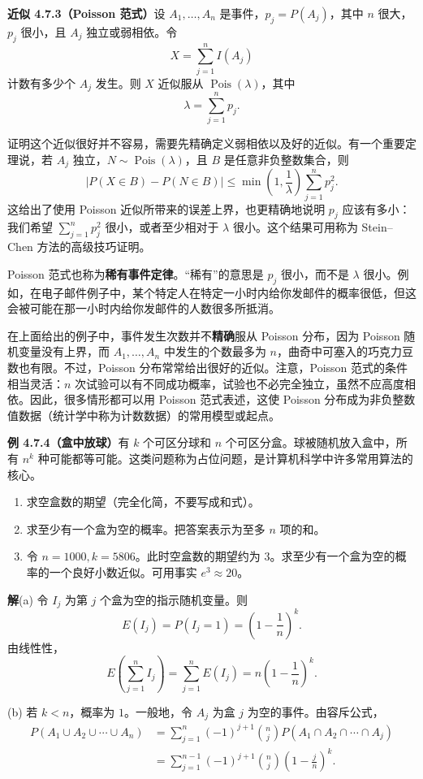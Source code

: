 \documentclass[UTF8,12pt,a4paper,fontset=fandol]{ctexart}
\begin{document}
\noindent\textbf{近似 4.7.3（Poisson 范式）}\quad 设 $A_1,\ldots,A_n$ 是事件，$p_j=P(A_j)$，其中 $n$ 很大，$p_j$ 很小，且 $A_j$ 独立或弱相依。令
\[
  X=\sum_{j=1}^n I(A_j)
\]
计数有多少个 $A_j$ 发生。则 $X$ 近似服从 $\operatorname{Pois}(\lambda)$，其中
\[
  \lambda=\sum_{j=1}^n p_j.
\]

证明这个近似很好并不容易，需要先精确定义弱相依以及好的近似。有一个重要定理说，若 $A_j$ 独立，$N\sim\operatorname{Pois}(\lambda)$，且 $B$ 是任意非负整数集合，则
\[
  |P(X\in B)-P(N\in B)|
  \le \min\left(1,\frac{1}{\lambda}\right)\sum_{j=1}^n p_j^2.
\]
这给出了使用 Poisson 近似所带来的误差上界，也更精确地说明 $p_j$ 应该有多小：我们希望 $\sum_{j=1}^n p_j^2$ 很小，或者至少相对于 $\lambda$ 很小。这个结果可用称为 Stein--Chen 方法的高级技巧证明。

Poisson 范式也称为\textbf{稀有事件定律}。“稀有”的意思是 $p_j$ 很小，而不是 $\lambda$ 很小。例如，在电子邮件例子中，某个特定人在特定一小时内给你发邮件的概率很低，但这会被可能在那一小时内给你发邮件的人数很多所抵消。

在上面给出的例子中，事件发生次数并不\textbf{精确}服从 Poisson 分布，因为 Poisson 随机变量没有上界，而 $A_1,\ldots,A_n$ 中发生的个数最多为 $n$，曲奇中可塞入的巧克力豆数也有限。不过，Poisson 分布常常给出很好的近似。注意，Poisson 范式的条件相当灵活：$n$ 次试验可以有不同成功概率，试验也不必完全独立，虽然不应高度相依。因此，很多情形都可以用 Poisson 范式表述，这使 Poisson 分布成为非负整数值数据（统计学中称为计数数据）的常用模型或起点。

\noindent\textbf{例 4.7.4（盒中放球）}\quad 有 $k$ 个可区分球和 $n$ 个可区分盒。球被随机放入盒中，所有 $n^k$ 种可能都等可能。这类问题称为占位问题，是计算机科学中许多常用算法的核心。

\begin{enumerate}
  \item[(a)] 求空盒数的期望（完全化简，不要写成和式）。
  \item[(b)] 求至少有一个盒为空的概率。把答案表示为至多 $n$ 项的和。
  \item[(c)] 令 $n=1000,k=5806$。此时空盒数的期望约为 $3$。求至少有一个盒为空的概率的一个良好小数近似。可用事实 $e^3\approx 20$。
\end{enumerate}

\noindent\textbf{解}\quad (a) 令 $I_j$ 为第 $j$ 个盒为空的指示随机变量。则
\[
  E(I_j)=P(I_j=1)=\left(1-\frac{1}{n}\right)^k.
\]
由线性性，
\[
  E\left(\sum_{j=1}^n I_j\right)
  =\sum_{j=1}^nE(I_j)
  =n\left(1-\frac{1}{n}\right)^k.
\]

(b) 若 $k<n$，概率为 $1$。一般地，令 $A_j$ 为盒 $j$ 为空的事件。由容斥公式，
\[
\begin{aligned}
  P(A_1\cup A_2\cup\cdots\cup A_n)
  &=\sum_{j=1}^n(-1)^{j+1}\binom{n}{j}P(A_1\cap A_2\cap\cdots\cap A_j)\\
  &=\sum_{j=1}^{n-1}(-1)^{j+1}\binom{n}{j}\left(1-\frac{j}{n}\right)^k.
\end{aligned}
\]
\end{document}

